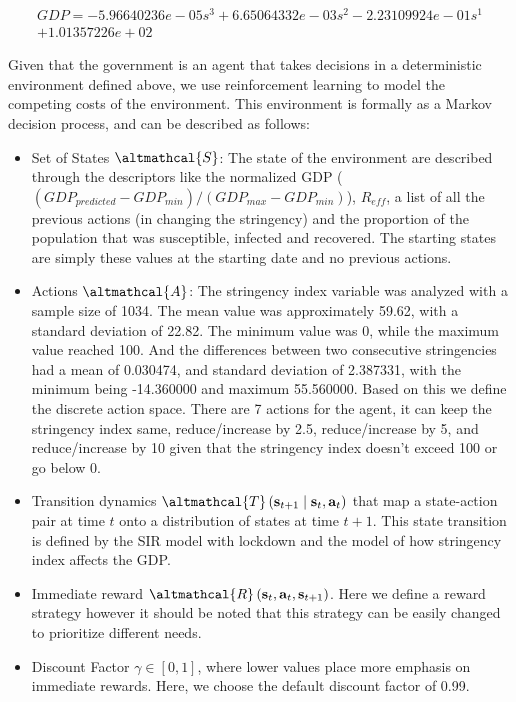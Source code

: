 \documentclass[tikz,fleqn,12pt]{wlscirep}
\begin{document}
\begin{equation}
    \begin{split}
      GDP = -5.96640236e-05 s^{3} + 6.65064332e-03 s^{2} -2.23109924e-01 s^{1} \\
    + 1.01357226e+02
    \end{split}
    \label{eq:gdp_modelled_with_stringency_IND}
\end{equation}

Given that the government is an agent that takes decisions in a deterministic environment defined above, we use reinforcement learning to model the competing costs of the environment. This environment is formally as a Markov decision process, and can be described as follows:
\begin{itemize}
    \item Set of States $\altmathcal{S}$: The state of the environment are described through the descriptors like the normalized GDP ($(GDP_{predicted} - GDP_{min}) / (GDP_{max} - GDP_{min})$), $R_{eff}$, a list of all the previous actions (in changing the stringency) and the proportion of the population that was susceptible, infected and recovered. The starting states are simply these values at the starting date and no previous actions.
    \item Actions $\altmathcal{A}$: The stringency index variable was analyzed with a sample size of 1034. The mean value was approximately 59.62, with a standard deviation of 22.82. The minimum value was 0, while the maximum value reached 100. And the differences between two consecutive stringencies had a mean of 0.030474, and standard deviation of 2.387331, with the minimum being -14.360000 and maximum 55.560000. Based on this we define the discrete action space. There are 7 actions for the agent, it can keep the stringency index same, reduce/increase by 2.5, reduce/increase by 5, and reduce/increase by 10 given that the stringency index doesn't exceed 100 or go below 0.
    \item Transition dynamics $\altmathcal{T}\left(\mathbf{s}_{t+1} \mid \mathbf{s}_t, \mathbf{a}_t\right)$ that map a state-action pair at time $t$ onto a distribution of states at time $t+1$. This state transition is defined by the SIR model with lockdown and the model of how stringency index affects the GDP.
    \item Immediate reward $\altmathcal{R}\left(\mathbf{s}_t, \mathbf{a}_t, \mathbf{s}_{t+1}\right)$. Here we define a reward strategy however it should be noted that this strategy can be easily changed to prioritize different needs.
    \item Discount Factor $\gamma \in[0,1]$, where lower values place more emphasis on immediate rewards. Here, we choose the default discount factor of 0.99.
\end{itemize}
\end{document}
